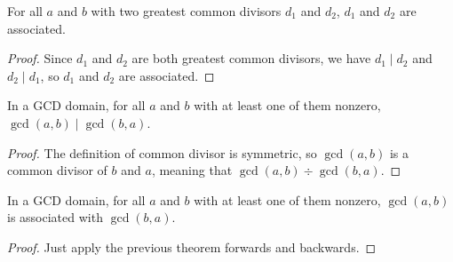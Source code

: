 \documentclass[../../math.tex]{subfiles}
\begin{document}
\begin{theorem} \label{gcd_associates}
    For all $a$ and $b$ with two greatest common divisors $d_1$ and $d_2$, $d_1$
    and $d_2$ are associated.
\end{theorem}
\begin{proof}
    Since $d_1$ and $d_2$ are both greatest common divisors, we have $d_1 \mid
    d_2$ and $d_2 \mid d_1$, so $d_1$ and $d_2$ are associated.
\end{proof}

\begin{theorem} \label{gcd_div_comm}
    In a GCD domain, for all $a$ and $b$ with at least one of them nonzero,
    $\gcd(a, b) \mid \gcd(b, a)$.
\end{theorem}
\begin{proof}
    The definition of common divisor is symmetric, so $\gcd(a, b)$ is a common
    divisor of $b$ and $a$, meaning that $\gcd(a, b) \div \gcd(b, a)$.
\end{proof}

\begin{theorem} \label{gcd_comm}
    In a GCD domain, for all $a$ and $b$ with at least one of them nonzero,
    $\gcd(a, b)$ is associated with $\gcd(b, a)$.
\end{theorem}
\begin{proof}
    Just apply the previous theorem forwards and backwards.
\end{proof}
\end{document}
